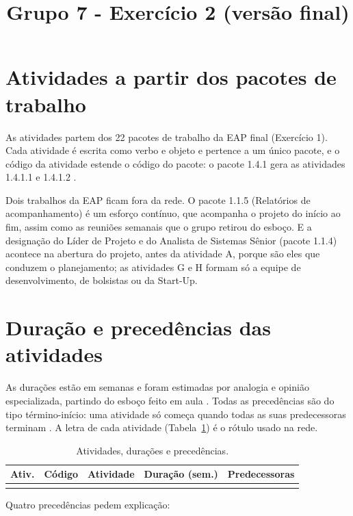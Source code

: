\documentclass[a4paper]{article}
\title{\textbf{Grupo 7 - Exercício 2 (versão final)}}
\makeatletter
\let\linhasgeradas\@@input
\makeatother
\begin{document}
\capa

\section{Atividades a partir dos pacotes de trabalho}

As atividades partem dos 22 pacotes de trabalho da EAP final (Exercício 1). Cada atividade é escrita como verbo e objeto e pertence a um único pacote, e o código da atividade estende o código do pacote: o pacote 1.4.1 gera as atividades 1.4.1.1 e 1.4.1.2 \cite{pmi2017}.

Dois trabalhos da EAP ficam fora da rede. O pacote 1.1.5 (Relatórios de acompanhamento) é um esforço contínuo, que acompanha o projeto do início ao fim, assim como as reuniões semanais que o grupo retirou do esboço. E a designação do Líder de Projeto e do Analista de Sistemas Sênior (pacote 1.1.4) acontece na abertura do projeto, antes da atividade A, porque são eles que conduzem o planejamento; as atividades G e H formam só a equipe de desenvolvimento, de bolsistas ou da Start-Up.

\section{Duração e precedências das atividades}

As durações estão em semanas e foram estimadas por analogia e opinião especializada, partindo do esboço feito em aula \cite{pmi2017}. Todas as precedências são do tipo término-início: uma atividade só começa quando todas as suas predecessoras terminam \cite{pmi2017}. A letra de cada atividade (Tabela~\ref{tab:atividades}) é o rótulo usado na rede.

{\small
\renewcommand{\arraystretch}{1.25}
\begin{longtable}{|c|l|>{\raggedright\arraybackslash}p{8.8cm}|c|>{\raggedright\arraybackslash}p{2.4cm}|}
    \hline
    \rowcolor{eapC}
    \textbf{Ativ.} & \textbf{Código} & \textbf{Atividade} & \textbf{Duração (sem.)} & \textbf{Predecessoras} \\
    \hline
    \endhead
    \linhasgeradas{rede/atividades}
    \caption{Atividades, durações e precedências.}
    \label{tab:atividades}
\end{longtable}
}

Quatro precedências pedem explicação:
\end{document}
